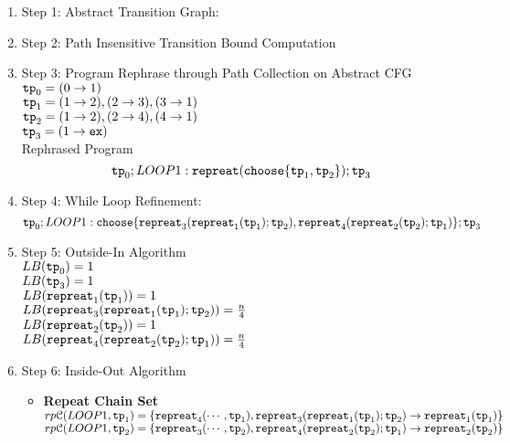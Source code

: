     \begin{enumerate}
      \item Step 1: Abstract Transition Graph:
    
    \item Step 2: Path Insensitive Transition Bound Computation
    
    \item Step 3: Program Rephrase through Path Collection on Abstract CFG
    \\
    $\mathtt{tp}_0 = (0 \to 1)$
    \\
    $\mathtt{tp}_1 = (1 \to 2), (2 \to 3), (3 \to 1)$
    \\
    $\mathtt{tp}_2 = (1 \to 2), (2 \to 4), (4 \to 1)$
    \\
    $\mathtt{tp}_3 = (1 \to \mathtt{ex})$
    \\
    Rephrased Program
    \[
    \mathtt{tp}_0 ; LOOP1: \mathtt{repreat}(\mathtt{choose}\{\mathtt{tp}_1, \mathtt{tp}_2 \}); \mathtt{tp}_3
    \]
    \item Step 4: While Loop Refinement:
    \[
      \mathtt{tp}_0 ; LOOP1: \mathtt{choose}\{\mathtt{repreat}_3(\mathtt{repreat}_1(\mathtt{tp}_1); \mathtt{tp}_2) , \mathtt{repreat}_4(\mathtt{repreat}_2(\mathtt{tp}_2); \mathtt{tp}_1) \}; \mathtt{tp}_3
      \]
    \item Step 5: Outside-In Algorithm
    \\
    $LB(\mathtt{tp}_0) = 1$
    \\
    $LB(\mathtt{tp}_3) = 1$
    \\
    $LB(\mathtt{repreat}_1(\mathtt{tp}_1)) = 1 $
    \\
    $LB(\mathtt{repreat}_3(\mathtt{repreat}_1(\mathtt{tp}_1); \mathtt{tp}_2)) = \frac{n}{4} $
    \\
    $LB(\mathtt{repreat}_2(\mathtt{tp}_2)) = 1 $
    \\
    $LB(\mathtt{repreat}_4(\mathtt{repreat}_2(\mathtt{tp}_2); \mathtt{tp}_1)) = \frac{n}{4} $
    \item Step 6: Inside-Out Algorithm
    \begin{itemize}
      \item \textbf{Repeat Chain Set}
      \\
      $rp\mathcal{C}(LOOP1, \mathtt{tp}_1) = \{\mathtt{repreat}_4(\cdots, \mathtt{tp}_1), \mathtt{repreat}_3(\mathtt{repreat}_1(\mathtt{tp}_1); \mathtt{tp}_2) \to \mathtt{repreat}_1(\mathtt{tp}_1)\}$ \\
      $rp\mathcal{C}(LOOP1, \mathtt{tp}_2) = \{\mathtt{repreat}_3(\cdots, \mathtt{tp}_2), \mathtt{repreat}_4(\mathtt{repreat}_2(\mathtt{tp}_2); \mathtt{tp}_1) \to \mathtt{repreat}_2(\mathtt{tp}_2)\}$ \\

\end{itemize}
\end{enumerate}
